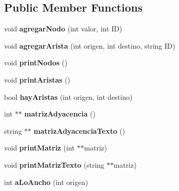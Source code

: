 \subsection*{Public Member Functions}
\begin{DoxyCompactItemize}
\item 
\mbox{\label{class_grafo_a371415fb11b7a9f7159071b4f61ef9de}} 
void {\bfseries agregar\+Nodo} (int valor, int ID)
\item 
\mbox{\label{class_grafo_a43a0d5ad772e6eda6203aad0682ba7a7}} 
void {\bfseries agregar\+Arista} (int origen, int destino, string ID)
\item 
\mbox{\label{class_grafo_a49a0553b340fd2bf7902def48a2e80ce}} 
void {\bfseries print\+Nodos} ()
\item 
\mbox{\label{class_grafo_a4ff6a98b75185a29e46f135d2f426d9e}} 
void {\bfseries print\+Aristas} ()
\item 
\mbox{\label{class_grafo_a7e4e4d7841645b079d7c917a1ada8dd1}} 
bool {\bfseries hay\+Aristas} (int origen, int destino)
\item 
\mbox{\label{class_grafo_ab4c4d98d9eadd6a7c69c0cbcf0bbaa41}} 
int $\ast$$\ast$ {\bfseries matriz\+Adyacencia} ()
\item 
\mbox{\label{class_grafo_a1bd0141c8287ecef32e9d8cd360ddc52}} 
string $\ast$$\ast$ {\bfseries matriz\+Adyacencia\+Texto} ()
\item 
\mbox{\label{class_grafo_a1a2bae5ed701b47866ed740d093be38a}} 
void {\bfseries print\+Matriz} (int $\ast$$\ast$matriz)
\item 
\mbox{\label{class_grafo_ad5e0df300d3f4b83623f5787f6b7a2d3}} 
void {\bfseries print\+Matriz\+Texto} (string $\ast$$\ast$matriz)
\item 
\mbox{\label{class_grafo_aeeff5cd107c3423adbbf3a68818cf4ad}} 
int {\bfseries a\+Lo\+Ancho} (int origen)
\item 
\mbox{\label{class_grafo_a371415fb11b7a9f7159071b4f61ef9de}} 

\end{DoxyCompactItemize}

